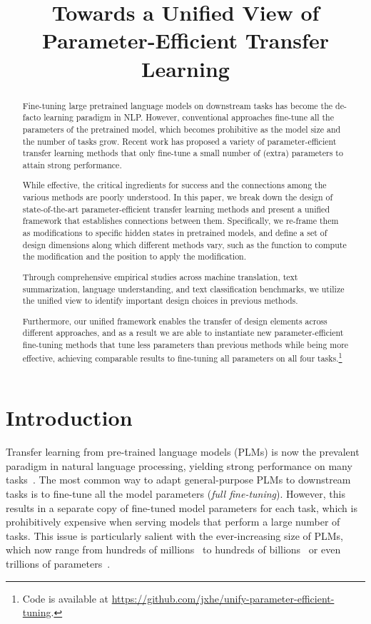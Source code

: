 \title{Towards a Unified View of Parameter-Efficient Transfer Learning}

\begin{abstract}
Fine-tuning large pretrained language models on downstream tasks has become the de-facto learning paradigm in NLP. However, conventional approaches fine-tune all the parameters of the pretrained model, which becomes prohibitive as the model size and the number of tasks grow. Recent work has proposed a variety of parameter-efficient transfer learning methods that only fine-tune a small number of (extra) parameters to attain strong performance. 

While effective, the critical ingredients for success and the connections among the various methods are poorly understood. In this paper, we break down the design of state-of-the-art parameter-efficient transfer learning methods and present a unified framework that establishes connections between them. Specifically, we re-frame them as modifications to specific hidden states in pretrained models, and define a set of design dimensions along which different methods vary, such as the function to compute the modification and the position to apply the modification.

Through comprehensive empirical studies across machine translation, text summarization, language understanding, and text classification benchmarks, we utilize the unified view to identify important design choices in previous methods.

Furthermore, our unified framework enables the transfer of design elements across different approaches, and as a result we are able to instantiate new parameter-efficient fine-tuning methods that tune less parameters than previous methods while being more effective, achieving comparable results to fine-tuning all parameters on all four tasks.\footnote{
Code is available at \href{https://github.com/jxhe/unify-parameter-efficient-tuning}{https://github.com/jxhe/unify-parameter-efficient-tuning}.
}
\end{abstract}

\section{Introduction}

Transfer learning from pre-trained language models (PLMs) is now the prevalent paradigm in natural language processing, yielding strong performance on many tasks~\citep{peters2018deep,devlin2019bert,qiu2020pre}. The most common way to adapt general-purpose PLMs to downstream tasks is to fine-tune all the model parameters (\emph{full fine-tuning}). However, this results in a separate copy of fine-tuned model parameters for each task, which is prohibitively expensive when serving models that perform a large number of tasks. This issue is particularly salient with the ever-increasing size of PLMs, which now range from hundreds of millions~\citep{radford2019language,lewis-etal-2020-bart} to hundreds of billions~\citep{brown2020language} or even trillions of parameters~\citep{fedus2021switch}.

